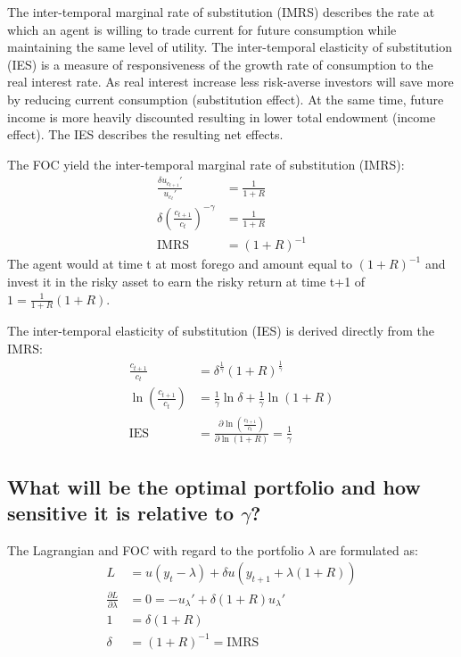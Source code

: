 \documentclass[12pt]{article}
\begin{document}
	The inter-temporal marginal rate of substitution (IMRS) describes the rate at which an agent is willing to trade current for future consumption while maintaining the same level of utility. The inter-temporal elasticity of substitution (IES) is a measure of responsiveness of the growth rate of consumption to the real interest rate. As real interest increase less risk-averse investors will save more by reducing current consumption (substitution effect). At the same time, future income is more heavily discounted resulting in lower total endowment (income effect). The IES describes the resulting net effects.
	
	The FOC yield the inter-temporal marginal rate of substitution (IMRS):
	\begin{align*}
		\frac{\delta u_{c_{t+1}}'}{u_{c_t}'} &= \frac{1}{1+R}\\
		\delta \left( \frac{c_{t+1}}{c_t} \right)^{-\gamma} &= \frac{1}{1+R}\\
		\text{IMRS} &= (1+R)^{-1}
	\end{align*}
	The agent would at time t at most forego and amount equal to $(1+R)^{-1}$ and invest it in the risky asset to earn the risky return at time t+1 of $1 = \frac{1}{1+R}(1+R)$. 
	
	The inter-temporal elasticity of substitution (IES) is derived directly from the IMRS:
	\begin{align*}
		\frac{c_{t+1}}{c_t} &= \delta^{\frac{1}{\gamma}}(1+R)^{\frac{1}{\gamma}}\\
		\ln \left(\frac{c_{t+1}}{c_t}\right) &= \frac{1}{\gamma} \ln \delta + \frac{1}{\gamma} \ln (1+R)\\
		\text{IES} &= \frac{\partial \ln (\frac{c_{t+1}}{c_t})}{\partial\ln (1+R)} = \frac{1}{\gamma}
	\end{align*}
	
	\subsection{What will be the optimal portfolio and how sensitive it is relative to $\gamma$?}

	The Lagrangian and FOC with regard to the portfolio $\lambda$ are formulated as:
	\begin{align*}
		L &= u(y_t - \lambda) + \delta u(y_{t+1} + \lambda(1+R))\\
		\frac{\partial L}{\partial \lambda} &= 0 = -u_\lambda' + \delta (1+R) u_\lambda'\\
		1 &= \delta (1+R)\\
		\delta &= (1+R)^{-1} = \text{IMRS}
	\end{align*}
	
\end{document}
